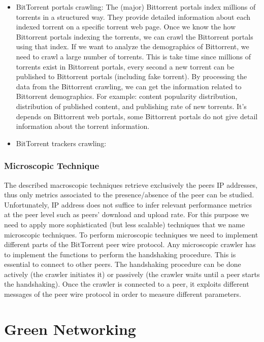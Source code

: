 \begin{itemize}
\item BitTorrent portals crawling: 
The (major) Bittorrent portals index millions of torrents in a structured way. 
They provide detailed information about each indexed torrent on a specific torrent web page. 
Once we know the how Bittorrent portals indexing the torrents, we can crawl the Bittorrent portals using that index.
If we want to analyze the demographics of Bittorrent, we need to crawl a large number of torrents.
This is take time since millions of torrents exist in Bittorrent portals, every second a new torrent can be published to Bittorrent portals (including fake torrent).
By processing the data from the Bittorrent crawling, we can get the information related to Bittorrent demographics.
For example: content popularity distribution, distribution of published content, and publishing rate of new torrents.
It's depends on Bittorrent web portals, some Bittorrent portals do not give detail information about the torrent information. 

\item BitTorrent trackers crawling:



\end{itemize}




\subsubsection{Microscopic Technique}
The described macroscopic techniques retrieve exclusively the peers IP addresses, thus only metrics associated to the presence/absence of the peer can be studied. Unfortunately, IP address does not suffice to infer relevant performance metrics at the peer level such as peers’ download and upload rate. 
For this purpose we need to apply more sophisticated (but less scalable) techniques that we name microscopic techniques.
To perform microscopic techniques we need to implement different parts of the BitTorrent peer wire protocol. 
Any microscopic crawler has to implement the functions to perform the handshaking procedure. 
This is essential to connect to other peers. 
The handshaking procedure can be done actively (the crawler initiates it) or passively (the crawler waits until a peer starts the handshaking). 
Once the crawler is connected to a peer, it exploits different messages of the peer wire protocol in order to measure different parameters. 


\section{Green Networking}

